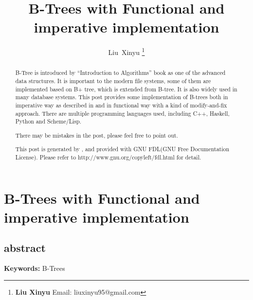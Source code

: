 \documentclass{article}
\begin{document}
\fi


\title{B-Trees with Functional and imperative implementation}

\author{Liu~Xinyu
\thanks{{\bfseries Liu Xinyu } \newline
  Email: liuxinyu95@gmail.com \newline}
  }


\maketitle

\ifx\wholebook\relax
\chapter{B-Trees with Functional and imperative implementation}

\section{abstract}
\else
\begin{abstract}
\fi
B-Tree is introduced by ``Introduction to Algorithms'' book\cite{CLRS} 
as one of the advanced data
structures. It is important to the modern file systems, some of them
are implemented based on B+ tree, which is extended from B-tree.
It is also widely used in many database systems. This post provides
some implementation of B-trees both in imperative way as described in
\cite{CLRS} and in functional way with a kind of modify-and-fix
approach. There are multiple programming languages used, including
C++, Haskell, Python and Scheme/Lisp.

There may be mistakes in the post, please feel free to point out.

This post is generated by \LaTeXe, and provided with GNU FDL(GNU Free Documentation License).
Please refer to http://www.gnu.org/copyleft/fdl.html for detail.

\ifx\wholebook\relax \else
\end{abstract}
\fi

\vspace{3cm}
{\bfseries Keywords:} B-Trees

\end{document}
